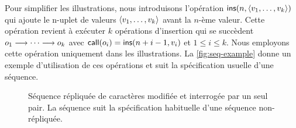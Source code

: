 Pour simplifier les illustrations, nous introduisons l'opération $\trm{ins}(n, \tuple*{v_1,\dotsc,v_k})$ qui ajoute le n-uplet de valeurs $\tuple*{v_1,\dotsc,v_k}$ avant la $n$-ème valeur.
Cette opération revient à exécuter $k$ opérations d'insertion qui se succèdent $o_1 \pre \dotsb \pre o_k$ avec $\trm{call}(o_i) = \trm{ins}(n+i-1, v_i)$ et $1 \leq i \leq k$.
Nous employons cette opération uniquement dans les illustrations.
La \autoref{fig:seq-example} donne un exemple d'utilisation de ces opérations et suit la spécification usuelle d'une séquence.

\begin{figure}[htb]
    \newcommand*\hsep{1.2}
    \centering
    \caption[Séquence répliquée de caractères modifiée et interrogée par un seul pair]{Séquence répliquée de caractères modifiée et interrogée par un seul pair.
    La séquence suit la spécification habituelle d'une séquence non-répliquée.}\label{fig:seq-example}
\end{figure}

